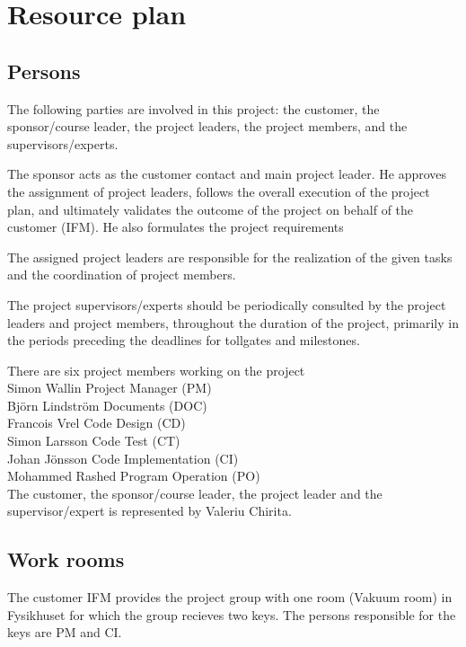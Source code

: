 \section{Resource plan}
\subsection{Persons}


The following parties are involved in this project: the customer, the sponsor/course leader, the project leaders, the project members, and the supervisors/experts.

The sponsor acts as the customer contact and main project leader. He approves the assignment of project leaders, follows the overall execution of the project plan, and ultimately validates the outcome of the project on behalf of the customer (IFM). He also formulates the project requirements 

The assigned project leaders are responsible for the realization of the given tasks and the coordination of project members. 

The project supervisors/experts should be periodically consulted by the project leaders and project members, throughout the duration of the project, primarily in the periods preceding the deadlines for tollgates and milestones.

There are six project members working on the project\\

Simon Wallin Project Manager (PM)\\
Björn Lindström Documents (DOC)\\
Francois Vrel Code Design (CD)\\
Simon Larsson Code Test (CT)\\
Johan Jönsson Code Implementation (CI)\\
Mohammed Rashed Program Operation (PO)\\

The customer, the sponsor/course leader, the project leader and the supervisor/expert is represented by Valeriu Chirita.

\subsection{Work rooms}

The customer IFM provides the project group with one room (Vakuum room) in Fysikhuset for which the group recieves two keys.
The persons responsible for the keys are PM and CI.

